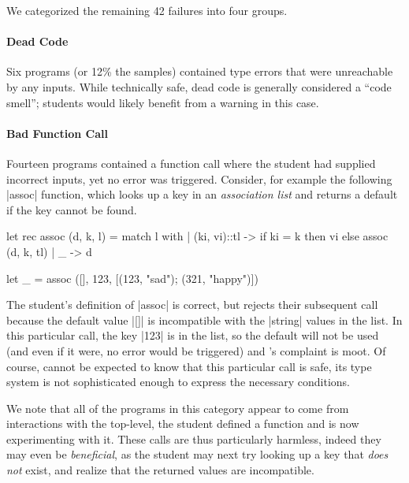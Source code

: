 We categorized the remaining 42 failures into four groups.

\paragraph{Dead Code}
%
Six programs (or 12\% the samples) contained type errors that were
unreachable by any inputs.
%
While technically safe, dead code is generally considered a ``code
smell''; students would likely benefit from a warning in this case.

\paragraph{Bad Function Call}
Fourteen programs contained a function call where the student had
supplied incorrect inputs, yet no error was triggered.
%
Consider, for example the following |assoc| function, which
looks up a key in an \emph{association list} and returns a default if
the key cannot be found.
%
\begin{code}
  let rec assoc (d, k, l) = match l with
    | (ki, vi)::tl ->
       if ki = k then
         vi
       else
         assoc (d, k, tl)
    | _ -> d

  let _ = assoc ([], 123, [(123, "sad"); (321, "happy")])
\end{code}
%
The student's definition of |assoc| is correct, but \ocaml rejects their
subsequent call because the default value |[]| is incompatible with the
|string| values in the list.
%
In this particular call, the key |123| is in the list, so the default
will not be used (and even if it were, no error would be triggered) and
\ocaml's complaint is moot.
%
Of course, \ocaml cannot be expected to know that this particular call
is safe, its type system is not sophisticated enough to express the
necessary conditions.

We note that all of the programs in this category appear to come from
interactions with the \ocaml top-level, \ie the student defined a
function and is now experimenting with it.
%
These calls are thus particularly harmless, indeed they may even be
\emph{beneficial}, as the student may next try looking up a key that
\emph{does not} exist, and realize that the returned values are
incompatible.


